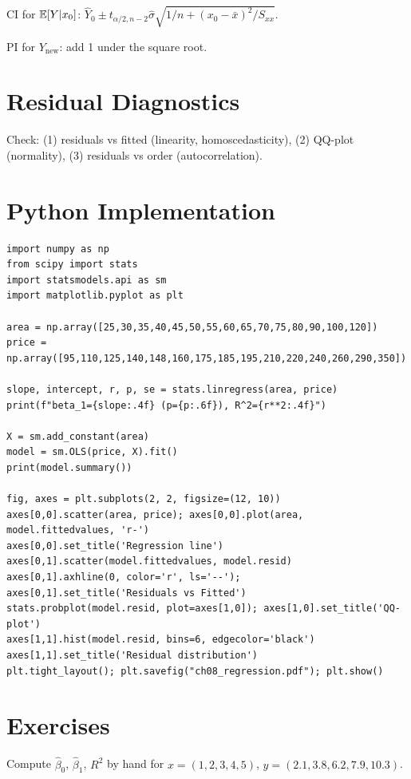 CI for $\mathbb{E}[Y|x_0]$: $\hat{Y}_0\pm t_{\alpha/2,n-2}\hat{\sigma}\sqrt{1/n+(x_0-\bar{x})^2/S_{xx}}$.

PI for $Y_{\text{new}}$: add 1 under the square root.

\section{Residual Diagnostics}
Check: (1) residuals vs fitted (linearity, homoscedasticity), (2) QQ-plot (normality), (3) residuals vs order (autocorrelation).

\section{Python Implementation}

\begin{python}
\begin{verbatim}
import numpy as np
from scipy import stats
import statsmodels.api as sm
import matplotlib.pyplot as plt

area = np.array([25,30,35,40,45,50,55,60,65,70,75,80,90,100,120])
price = np.array([95,110,125,140,148,160,175,185,195,210,220,240,260,290,350])

slope, intercept, r, p, se = stats.linregress(area, price)
print(f"beta_1={slope:.4f} (p={p:.6f}), R^2={r**2:.4f}")

X = sm.add_constant(area)
model = sm.OLS(price, X).fit()
print(model.summary())

fig, axes = plt.subplots(2, 2, figsize=(12, 10))
axes[0,0].scatter(area, price); axes[0,0].plot(area, model.fittedvalues, 'r-')
axes[0,0].set_title('Regression line')
axes[0,1].scatter(model.fittedvalues, model.resid)
axes[0,1].axhline(0, color='r', ls='--'); axes[0,1].set_title('Residuals vs Fitted')
stats.probplot(model.resid, plot=axes[1,0]); axes[1,0].set_title('QQ-plot')
axes[1,1].hist(model.resid, bins=6, edgecolor='black')
axes[1,1].set_title('Residual distribution')
plt.tight_layout(); plt.savefig("ch08_regression.pdf"); plt.show()
\end{verbatim}
\end{python}

\section{Exercises}

\begin{exercise}[$\star$]
Compute $\hat{\beta}_0$, $\hat{\beta}_1$, $R^2$ by hand for $x=(1,2,3,4,5)$, $y=(2.1,3.8,6.2,7.9,10.3)$.
\end{exercise}


